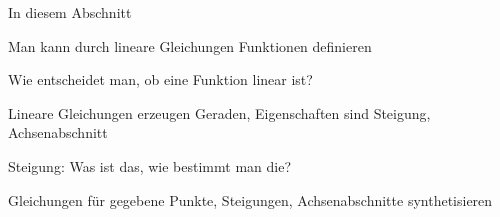 \documentclass[../../main.tex]{subfiles}
\begin{document}
In diesem Abschnitt 

Man kann durch lineare Gleichungen Funktionen definieren

Wie entscheidet man, ob eine Funktion linear ist?

Lineare Gleichungen erzeugen Geraden, Eigenschaften sind Steigung, Achsenabschnitt

Steigung: Was ist das, wie bestimmt man die?

Gleichungen für gegebene Punkte, Steigungen, Achsenabschnitte synthetisieren
\end{document}
